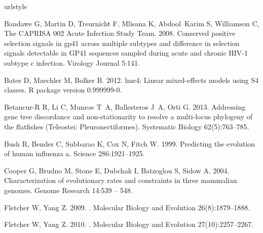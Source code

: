 \documentclass[11pt]{article}
\begin{document}
\begin{thebibliography}{27}
\providecommand{\natexlab}[1]{#1}
\expandafter\ifx\csname urlstyle\endcsname\relax
  \providecommand{\doi}[1]{doi:\discretionary{}{}{}#1}\else
  \providecommand{\doi}{doi:\discretionary{}{}{}\begingroup
  \urlstyle{rm}\Url}\fi

Bandawe G, Martin D, Treurnicht F, Mlisana K, Abdool~Karim S, Williamson C,
  {The CAPRISA 002 Acute Infection Study Team}. 2008.
\newblock Conserved positive selection signals in gp41 across multiple subtypes
  and difference in selection signals detectable in {GP41} sequences sampled
  during acute and chronic {HIV-1} subtype c infection.
\newblock Virology Journal 5:141.

Bates D, Maechler M, Bolker B. 2012.
\newblock lme4: Linear mixed-effects models using S4 classes.
\newblock R package version 0.999999-0.

{Betancur-R} R, Li C, Munroe T~A, Ballesteros J~A, Orti G. 2013.
\newblock Addressing gene tree discordance and non-stationarity to resolve a
  multi-locus phylogeny of the flatfishes {(Teleostei: Pleuronectiformes)}.
\newblock Systematic Biology 62(5):763--785.

Bush R, Bender C, Subbarao K, Cox N, Fitch W. 1999.
\newblock Predicting the evolution of human influenza a.
\newblock Science 286:1921--1925.

Cooper G, Brudno M, Stone E, Dubchak I, Batzoglou S, Sidow A. 2004.
\newblock Characterization of evolutionary rates and constraints in three
  mammalian genomes.
\newblock Genome Research 14:539 -- 548.

Fletcher W, Yang Z. 2009.
.
\newblock Molecular Biology and Evolution 26(8):1879--1888.

Fletcher W, Yang Z. 2010.
.
\newblock Molecular Biology and Evolution 27(10):2257--2267.


\end{thebibliography}
\end{document}
